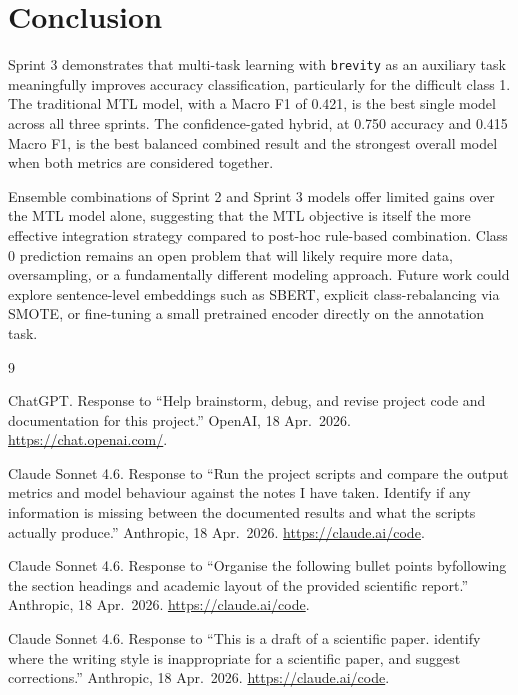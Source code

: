 \documentclass[11pt,twocolumn]{article}
\begin{document}
\section{Conclusion}

Sprint 3 demonstrates that multi-task learning with \texttt{brevity} as an
auxiliary task meaningfully improves accuracy classification, particularly for
the difficult class 1. The traditional MTL model, with a Macro F1 of 0.421, is
the best single model across all three sprints. The confidence-gated hybrid, at
0.750 accuracy and 0.415 Macro F1, is the best balanced combined result and the
strongest overall model when both metrics are considered together.

Ensemble combinations of Sprint 2 and Sprint 3 models offer limited gains over
the MTL model alone, suggesting that the MTL objective is itself the more
effective integration strategy compared to post-hoc rule-based combination.
Class 0 prediction remains an open problem that will likely require more data,
oversampling, or a fundamentally different modeling approach. Future work could
explore sentence-level embeddings such as SBERT, explicit class-rebalancing via
SMOTE, or fine-tuning a small pretrained encoder directly on the annotation
task.

\begin{thebibliography}{9}

ChatGPT.
Response to ``Help brainstorm, debug, and revise project code and documentation
for this project.''
OpenAI, 18 Apr.\ 2026.
\url{https://chat.openai.com/}.

Claude Sonnet 4.6.
Response to ``Run the project scripts and compare the output metrics and model
behaviour against the notes I have taken. Identify if any information is 
missing between the documented results and what the scripts actually
produce.''
Anthropic, 18 Apr.\ 2026.
\url{https://claude.ai/code}.

Claude Sonnet 4.6.
Response to ``Organise the following bullet points byfollowing the section 
headings and academic layout of the provided scientific report.''
Anthropic, 18 Apr.\ 2026.
\url{https://claude.ai/code}.

Claude Sonnet 4.6.
Response to ``This is a draft of a scientific paper. identify where the writing
style is inappropriate for a scientific paper, and suggest corrections.''
Anthropic, 18 Apr.\ 2026.
\url{https://claude.ai/code}.

\end{thebibliography}
\end{document}
